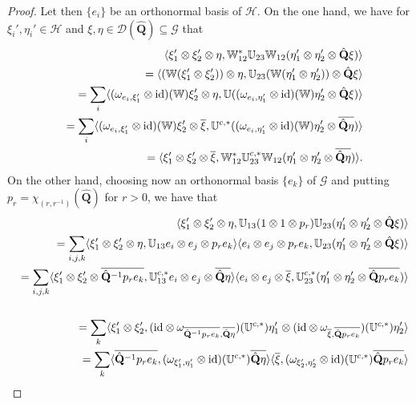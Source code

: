 \documentclass[11pt, reqno]{amsart}
\theoremstyle{definition}
\numberwithin{equation}{section}
\def\msD{\mathscr D}
\def\Gc{\mathcal G}
\def\Hc{\mathcal H}
\newcommand{\Qb}{\mathbf{Q}}
\newcommand{\id}{\mathrm{id}}
\newcommand{\Wbb}{\mathbb{W}}
\newcommand{\Ubb}{\mathbb{U}}
\begin{document}
\begin{proof}
Let then $\{e_i\}$ be an orthonormal basis of $\Hc$. On the one hand, we have for $\xi_i',\eta_i' \in \Hc$ and $\xi,\eta\in \msD(\hat{\Qb})\subseteq \Gc$ that 
\begin{eqnarray*} 
&&\hspace{-2cm} \langle \xi_1' \otimes \xi_2' \otimes \eta,\Wbb_{12}^*\Ubb_{23}\Wbb_{12}(\eta_1'\otimes \eta_2'\otimes \hat{\Qb}\xi)\rangle \\
&& = \langle (\Wbb(\xi_1' \otimes \xi_2')) \otimes \eta,\Ubb_{23}(\Wbb(\eta_1'\otimes \eta_2'))\otimes \hat{\Qb}\xi\rangle \\
&& = \sum_i \langle (\omega_{e_i,\xi_1'}\otimes \id)(\Wbb)\xi_2' \otimes \eta,\Ubb((\omega_{e_i,\eta_1'}\otimes \id)(\Wbb)\eta_2'\otimes \hat{\Qb}\xi)\rangle\\
&& = \sum_i \langle (\omega_{e_i,\xi_1'}\otimes \id)(\Wbb)\xi_2' \otimes \overline{\xi},\Ubb^{c,*}((\omega_{e_i,\eta_1'}\otimes \id)(\Wbb)\eta_2'\otimes \overline{\hat{\Qb}\eta})\rangle\\
&& = \langle \xi_1' \otimes \xi_2' \otimes \overline{\xi},\Wbb_{12}^*\Ubb_{23}^{c,*}\Wbb_{12}(\eta_1'\otimes \eta_2'\otimes \overline{\hat{\Qb}\eta})\rangle.
\end{eqnarray*}
On the other hand, choosing now an orthonormal basis $\{e_k\}$ of $\Gc$  and putting $p_r = \chi_{(r,r^{-1})}(\hat{\Qb})$ for $r>0$, we have that 
\begin{eqnarray*} 
&&\hspace{-1cm} \langle \xi_1' \otimes \xi_2' \otimes \eta,\Ubb_{13}(1\otimes 1 \otimes p_r)\Ubb_{23}(\eta_1'\otimes \eta_2'\otimes \hat{\Qb}\xi)\rangle \\
&& = \sum_{i,j,k}\langle \xi_1' \otimes \xi_2' \otimes \eta,\Ubb_{13}e_i \otimes e_j \otimes p_re_k\rangle \langle e_i \otimes e_j \otimes p_re_k,\Ubb_{23}(\eta_1'\otimes \eta_2'\otimes \hat{\Qb}\xi)\rangle\\
&& = \sum_{i,j,k}\langle \xi_1' \otimes \xi_2' \otimes \overline{\hat{\Qb}^{-1}p_re_k},\Ubb_{13}^{c,*}e_i \otimes e_j \otimes \overline{\hat{\Qb}\eta}\rangle \langle e_i \otimes e_j \otimes \overline{\xi},\Ubb_{23}^{c,*}(\eta_1'\otimes \eta_2'\otimes \overline{\hat{\Qb}p_re_k})\rangle\\
\\
&& = \sum_k \langle \xi_1'\otimes \xi_2', (\id\otimes \omega_{\overline{\hat{\Qb}^{-1}p_re_k},\overline{\hat{\Qb}\eta}})(\Ubb^{c,*})\eta_1' \otimes (\id\otimes \omega_{\overline{\xi},\overline{\hat{\Qb}p_re_k}})(\Ubb^{c,*})\eta_2'\rangle \\
&& = \sum_k \langle \overline{\hat{\Qb}^{-1}p_re_k}, (\omega_{\xi_1',\eta_1'}\otimes \id)(\Ubb^{c,*})\overline{\hat{\Qb}\eta}\rangle \langle \overline{\xi}, (\omega_{\xi_2',\eta_2'}\otimes \id)(\Ubb^{c,*})\overline{\hat{\Qb}p_re_k}\rangle\\

\end{eqnarray*}
\end{proof}
\end{document}
